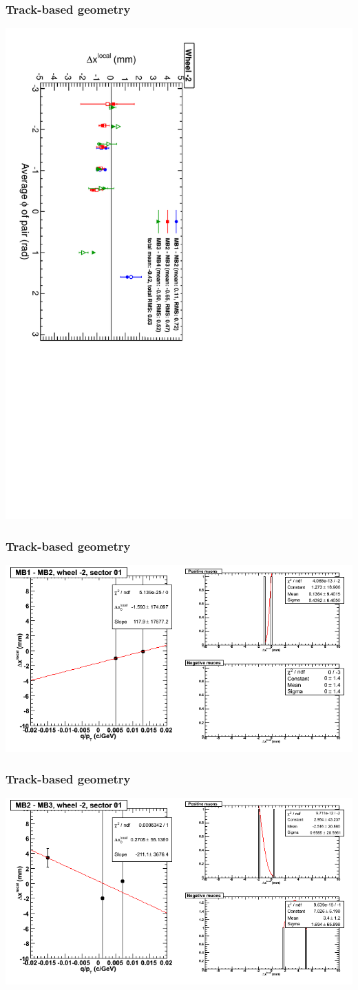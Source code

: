 \documentclass[compress]{beamer}
\begin{document}
\begin{frame}
\frametitle{Track-based geometry}
\includegraphics[height=\linewidth, angle=90]{NOV4_segdiff_x_whm2.pdf}
\end{frame}

\begin{frame}
\frametitle{Track-based geometry}
\includegraphics[width=\linewidth]{NOV4_segdiffs/dt13_resid_A_01_12.png}
\end{frame}

\begin{frame}
\frametitle{Track-based geometry}
\includegraphics[width=\linewidth]{NOV4_segdiffs/dt13_resid_A_01_23.png}
\end{frame}
\end{document}
